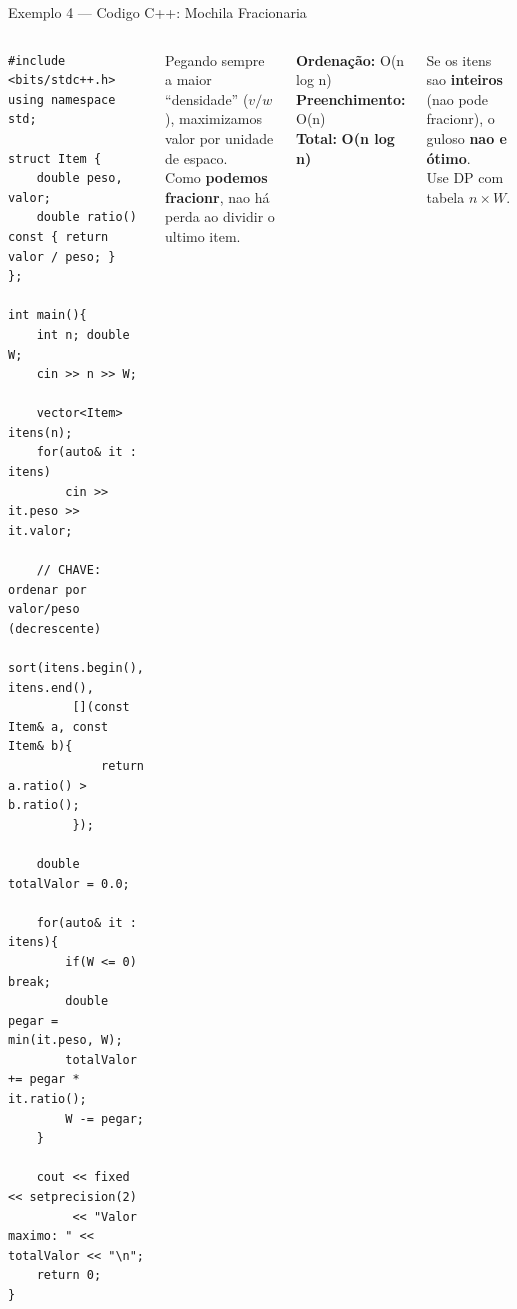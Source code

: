 \documentclass[aspectratio=169,10pt]{beamer}
\begin{document}
\begin{frame}[fragile,shrink=3]{Exemplo 4 --- Codigo C++: Mochila Fracionaria}
  \begin{columns}[t]
      \begin{tcolorbox}[caixaCodigo]
        \begin{lstlisting}[style=cppstyle]
#include <bits/stdc++.h>
using namespace std;

struct Item {
    double peso, valor;
    double ratio() const { return valor / peso; }
};

int main(){
    int n; double W;
    cin >> n >> W;

    vector<Item> itens(n);
    for(auto& it : itens)
        cin >> it.peso >> it.valor;

    // CHAVE: ordenar por valor/peso (decrescente)
    sort(itens.begin(), itens.end(),
         [](const Item& a, const Item& b){
             return a.ratio() > b.ratio();
         });

    double totalValor = 0.0;

    for(auto& it : itens){
        if(W <= 0) break;
        double pegar = min(it.peso, W);
        totalValor += pegar * it.ratio();
        W -= pegar;
    }

    cout << fixed << setprecision(2)
         << "Valor maximo: " << totalValor << "\n";
    return 0;
}
        \end{lstlisting}
      \end{tcolorbox}
      \begin{tcolorbox}[caixaDourada,title={Por que funciona?}]
        \footnotesize
        Pegando sempre a maior
        ``densidade'' ($v/w$), maximizamos
        valor por unidade de espaco.\\[4pt]
        Como \textbf{podemos fracionr},
        nao há perda ao dividir o ultimo item.
      \end{tcolorbox}
      \vspace{0.1cm}
      \begin{tcolorbox}[caixaAzul,title={Complexidade}]
        \footnotesize
        \textbf{Ordenação:} O(n log n)\\
        \textbf{Preenchimento:} O(n)\\
        \textbf{Total:} \textbf{O(n log n)}
      \end{tcolorbox}
      \vspace{0.1cm}
      \begin{tcolorbox}[caixaVermelho,title={0/1 Knapsack}]
        \footnotesize
        Se os itens sao \textbf{inteiros}
        (nao pode fracionr), o guloso
        \textbf{nao e ótimo}.\\[2pt]
        Use DP com tabela $n \times W$.
      \end{tcolorbox}
  \end{columns}
\end{frame}
\end{document}
